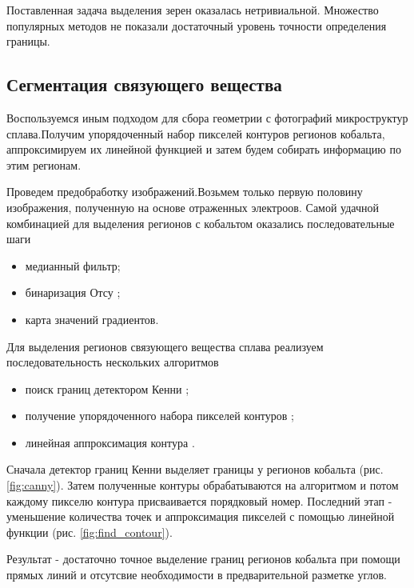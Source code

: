 \documentclass[a4paper, 14pt]{article}
\begin{document}
	Поставленная задача выделения зерен оказалась нетривиальной. Множество популярных методов не показали достаточный уровень точности определения границы.  
	\newpage
		\subsection{Сегментация связующего вещества}
		
	Воспользуемся иным подходом для сбора геометрии с фотографий микроструктур сплава.Получим упорядоченный набор пикселей контуров регионов кобальта, аппроксимируем их линейной функцией и затем будем собирать информацию по этим регионам. 	
	
	Проведем предобработку изображений.Возьмем только первую половину изображения, полученную на основе отраженных электроов. Самой удачной комбинацией для выделения регионов с кобальтом оказались последовательные шаги
	\begin{itemize}

		\item медианный фильтр; 
		
		\item бинаризация Отсу \cite{otsu}; 
		
		\item карта значений  градиентов.
	\end{itemize}


	Для выделения регионов связующего вещества сплава реализуем последовательность нескольких алгоритмов
	\begin{itemize}
		\item поиск границ детектором Кенни \cite{canny};
		
		\item получение упорядоченного набора пикселей контуров \cite{find_contour};
		
		\item линейная аппроксимация контура \cite{polygon_appx}.
	\end{itemize}
	Сначала детектор границ Кенни выделяет границы у регионов кобальта (рис. \ref{fig:canny}). Затем полученные контуры обрабатываются на алгоритмом \cite{find_contour} и потом каждому пикселю контура присваивается порядковый номер. Последний этап - уменьшение количества точек и аппроксимация пикселей с помощью линейной функции (рис. \ref{fig:find_contour}).
	
	Результат - достаточно точное выделение границ регионов кобальта при помощи прямых линий и отсутсвие необходимости в предварительной разметке углов.
	
\end{document}
